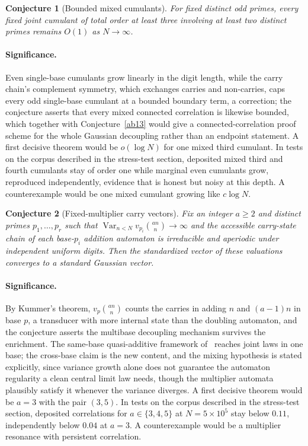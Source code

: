 \documentclass[11pt]{article}
\newtheorem{conjecture}{Conjecture}
\theoremstyle{definition}
\begin{document}
\begin{conjecture}[Bounded mixed cumulants]\label{ab17}
For fixed distinct odd primes, every fixed joint cumulant of total order at least three involving at least two distinct primes remains $O(1)$ as $N\to\infty$.
\end{conjecture}

\paragraph{Significance.}
Even single-base cumulants grow linearly in the digit length, while the carry chain's complement symmetry, which exchanges carries and non-carries, caps every odd single-base cumulant at a bounded boundary term, a correction; the conjecture asserts that every mixed connected correlation is likewise bounded, which together with Conjecture~\ref{ab13} would give a connected-correlation proof scheme for the whole Gaussian decoupling rather than an endpoint statement.  A first decisive theorem would be $o(\log N)$ for one mixed third cumulant.  In tests on the corpus described in the stress-test section, deposited mixed third and fourth cumulants stay of order one while marginal even cumulants grow, reproduced independently, evidence that is honest but noisy at this depth.  A counterexample would be one mixed cumulant growing like $c\log N$.

\begin{conjecture}[Fixed-multiplier carry vectors]\label{ab18}
Fix an integer $a\ge2$ and distinct primes $p_1,\ldots,p_r$ such that $\operatorname{Var}_{n<N}v_{p_i}\binom{an}{n}\to\infty$ and the accessible carry-state chain of each base-$p_i$ addition automaton is irreducible and aperiodic under independent uniform digits.  Then the standardized vector of these valuations converges to a standard Gaussian vector.
\end{conjecture}

\paragraph{Significance.}
By Kummer's theorem, $v_p\binom{an}{n}$ counts the carries in adding $n$ and $(a-1)n$ in base $p$, a transducer with more internal state than the doubling automaton, and the conjecture asserts the multibase decoupling mechanism survives the enrichment.  The same-base quasi-additive framework of~\cite{DK19} reaches joint laws in one base; the cross-base claim is the new content, and the mixing hypothesis is stated explicitly, since variance growth alone does not guarantee the automaton regularity a clean central limit law needs, though the multiplier automata plausibly satisfy it whenever the variance diverges.  A first decisive theorem would be $a=3$ with the pair $(3,5)$.  In tests on the corpus described in the stress-test section, deposited correlations for $a\in\{3,4,5\}$ at $N=5\times10^5$ stay below $0.11$, independently below $0.04$ at $a=3$.  A counterexample would be a multiplier resonance with persistent correlation.
\end{document}
